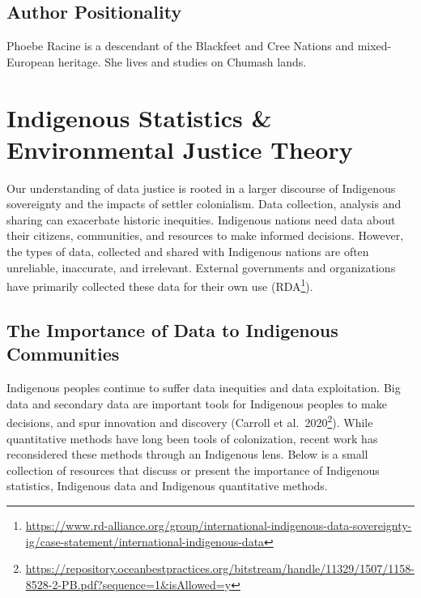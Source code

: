 \documentclass[
  11pt,
  paperpaper,
  openany]{book}
\DeclareRobustCommand{\href}[2]{#2\footnote{\url{#1}}}
\begin{document}
\hypertarget{author-positionality}{%
\section*{Author Positionality}\label{author-positionality}}

Phoebe Racine is a descendant of the Blackfeet and Cree Nations and mixed-European heritage. She lives and studies on Chumash lands.

\hypertarget{indigenous-statistics-environmental-justice-theory}{%
\chapter{Indigenous Statistics \& Environmental Justice Theory}\label{indigenous-statistics-environmental-justice-theory}}

Our understanding of data justice is rooted in a larger discourse of Indigenous sovereignty and the impacts of settler colonialism. Data collection, analysis and sharing can exacerbate historic inequities. Indigenous nations need data about their citizens, communities, and resources to make informed decisions. However, the types of data, collected and shared with Indigenous nations are often unreliable, inaccurate, and irrelevant. External governments and organizations have primarily collected these data for their own use (\href{https://www.rd-alliance.org/group/international-indigenous-data-sovereignty-ig/case-statement/international-indigenous-data}{RDA}).

\hypertarget{the-importance-of-data-to-indigenous-communities}{%
\section{The Importance of Data to Indigenous Communities}\label{the-importance-of-data-to-indigenous-communities}}

Indigenous peoples continue to suffer data inequities and data exploitation. Big data and secondary data are important tools for Indigenous peoples to make decisions, and spur innovation and discovery (\href{https://repository.oceanbestpractices.org/bitstream/handle/11329/1507/1158-8528-2-PB.pdf?sequence=1\&isAllowed=y}{Carroll et al.~2020}). While quantitative methods have long been tools of colonization, recent work has reconsidered these methods through an Indigenous lens. Below is a small collection of resources that discuss or present the importance of Indigenous statistics, Indigenous data and Indigenous quantitative methods.
\end{document}
